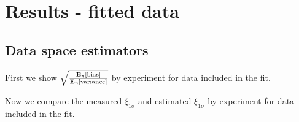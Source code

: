 \section{Results - fitted data}

\subsection{Data space estimators}

First we show $\sqrt{\frac{\mathbf{E}_{\eta}\left[ {\rm bias} \right]}{\mathbf{E}_{\eta}\left[ {\rm variance} \right]}}$ by experiment
for data included in the fit.



Now we compare the measured $\xi_{1\sigma}$ and estimated $\xi_{1\sigma}$ by experiment
for data included in the fit.


